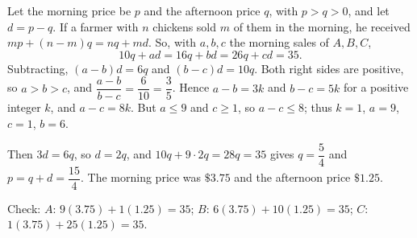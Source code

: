 Let the morning price be $p$ and the afternoon price $q$, with $p>q>0$, and let $d=p-q$. If a farmer with $n$ chickens sold $m$ of them in the morning, he received $mp+(n-m)q=nq+md$. So, with $a,b,c$ the morning sales of $A,B,C$,
\[
10q+ad=16q+bd=26q+cd=35 .
\]
Subtracting, $(a-b)d=6q$ and $(b-c)d=10q$. Both right sides are positive, so $a>b>c$, and $\dfrac{a-b}{b-c}=\dfrac{6}{10}=\dfrac{3}{5}$. Hence $a-b=3k$ and $b-c=5k$ for a positive integer $k$, and $a-c=8k$. But $a\le9$ and $c\ge1$, so $a-c\le8$; thus $k=1$, $a=9$, $c=1$, $b=6$.

Then $3d=6q$, so $d=2q$, and $10q+9\cdot2q=28q=35$ gives $q=\dfrac{5}{4}$ and $p=q+d=\dfrac{15}{4}$. The morning price was $\boxed{\$3.75}$ and the afternoon price $\boxed{\$1.25}$.

Check: $A$: $9(3.75)+1(1.25)=35$; $B$: $6(3.75)+10(1.25)=35$; $C$: $1(3.75)+25(1.25)=35$.
